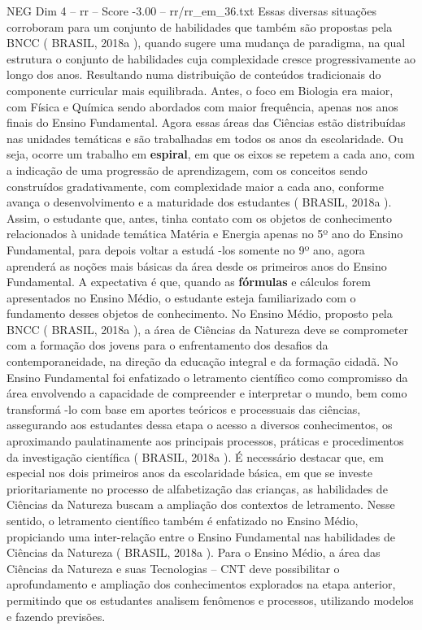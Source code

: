 \begin{textsample}{NEG Dim 4 – rr – Score -3.00 – rr/rr\_em\_36.txt}
Essas diversas situações corroboram para um conjunto de habilidades que também são propostas pela BNCC ( BRASIL, 2018a ), quando sugere uma mudança de paradigma, na qual estrutura o conjunto de habilidades cuja complexidade cresce progressivamente ao longo dos anos.
Resultando numa distribuição de conteúdos tradicionais do componente curricular mais equilibrada.
Antes, o foco em Biologia era maior, com Física e Química sendo abordados com maior frequência, apenas nos anos finais do Ensino Fundamental.
Agora essas áreas das Ciências estão distribuídas nas unidades temáticas e são trabalhadas em todos os anos da escolaridade.
Ou seja, ocorre um trabalho em \textbf{espiral}, em que os eixos se repetem a cada ano, com a indicação de uma progressão de aprendizagem, com os conceitos sendo construídos gradativamente, com complexidade maior a cada ano, conforme avança o desenvolvimento e a maturidade dos estudantes ( BRASIL, 2018a ).
Assim, o estudante que, antes, tinha contato com os objetos de conhecimento relacionados à unidade temática Matéria e Energia apenas no 5º ano do Ensino Fundamental, para depois voltar a estudá -los somente no 9º ano, agora aprenderá as noções mais básicas da área desde os primeiros anos do Ensino Fundamental.
A expectativa é que, quando as \textbf{fórmulas} e cálculos forem apresentados no Ensino Médio, o estudante esteja familiarizado com o fundamento desses objetos de conhecimento.
No Ensino Médio, proposto pela BNCC ( BRASIL, 2018a ), a área de Ciências da Natureza deve se comprometer com a formação dos jovens para o enfrentamento dos desafios da contemporaneidade, na direção da educação integral e da formação cidadã.
No Ensino Fundamental foi enfatizado o letramento científico como compromisso da área envolvendo a capacidade de compreender e interpretar o mundo, bem como transformá -lo com base em aportes teóricos e processuais das ciências, assegurando aos estudantes dessa etapa o acesso a diversos conhecimentos, os aproximando paulatinamente aos principais processos, práticas e procedimentos da investigação científica ( BRASIL, 2018a ).
É necessário destacar que, em especial nos dois primeiros anos da escolaridade básica, em que se investe prioritariamente no processo de alfabetização das crianças, as habilidades de Ciências da Natureza buscam a ampliação dos contextos de letramento.
Nesse sentido, o letramento científico também é enfatizado no Ensino Médio, propiciando uma inter-relação entre o Ensino Fundamental nas habilidades de Ciências da Natureza ( BRASIL, 2018a ).
Para o Ensino Médio, a área das Ciências da Natureza e suas Tecnologias – CNT deve possibilitar o aprofundamento e ampliação dos conhecimentos explorados na etapa anterior, permitindo que os estudantes analisem fenômenos e processos, utilizando modelos e fazendo previsões.

\end{textsample}
